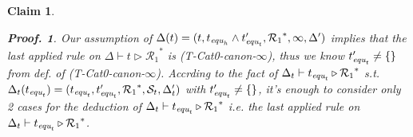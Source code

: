 \documentclass[12pt]{article}
\newtheorem{Claim}{Claim}[section]
\newtheorem{Proof}{Proof.}
\begin{document}
\begin{Claim}
\begin{Proof}
    Our assumption of $\Delta(t) = (t, t_{\text{\it equ}_h} \wedge
    t'_{\text{\it equ}_t}, {\mathcal{R}_1}^*, \infty, \Delta' )$ implies
    that the last applied rule on
    $\Delta \vdash t \triangleright {\mathcal{R}_1}^*$ is
    (T-Cat0-canon-$\infty$), thus we know
    $t'_{\text{\it equ}_t} \neq \{\}$ from def. of (T-Cat0-canon-$\infty$).
    Accrding to the fact of
    $\Delta_t \vdash t_{\text{\it equ}_t} \triangleright {\mathcal{R}_1}^*$
    s.t. $\Delta_t(t_{\text{\it equ}_t}) =(t_{\text{\it equ}_t},
    t'_{\text{\it equ}_t}, {\mathcal{R}_1}^*, \mathcal{S}_t, \Delta'_t)$
    with $t'_{\text{\it equ}_t} \neq \{\}$, it's enough to consider
    only 2 cases for the deduction of
    $\Delta_t \vdash t_{\text{\it equ}_t} \triangleright {\mathcal{R}_1}^*$
    i.e. the last applied rule on
    $\Delta_t \vdash t_{\text{\it equ}_t} \triangleright {\mathcal{R}_1}^*$.
    

\end{Proof}
\end{Claim}
\end{document}
